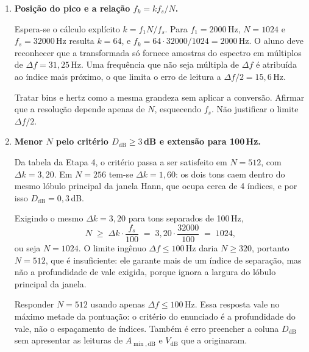 \documentclass[11pt,a4paper]{article}
\begin{document}
\begin{enumerate}[label=\textbf{Q\arabic*.}, leftmargin=*, itemsep=1em]

  \item \textbf{Posição do pico e a relação $f_k = k f_s/N$.}

    Espera-se o cálculo explícito $k = f_1 N / f_s$. Para $f_1 = 2000$\,Hz,
    $N = 1024$ e $f_s = 32000$\,Hz resulta $k = 64$, e
    $f_k = 64 \cdot 32000/1024 = 2000$\,Hz. O aluno deve reconhecer que a
    transformada só fornece amostras do espectro em múltiplos de
    $\Delta f = 31{,}25$\,Hz. Uma frequência que não seja múltipla de
    $\Delta f$ é atribuída ao índice mais próximo, o que limita o erro de
    leitura a $\Delta f/2 = 15{,}6$\,Hz.

    \begin{nota}
      Tratar bins e hertz como a mesma grandeza sem aplicar a conversão.
      Afirmar que a resolução depende apenas de $N$, esquecendo $f_s$. Não
      justificar o limite $\Delta f/2$.
    \end{nota}

  \item \textbf{Menor $N$ pelo critério $D_{\mathrm{dB}} \geq 3$\,dB e extensão
    para 100\,Hz.}

    Da tabela da Etapa 4, o critério passa a ser satisfeito em $N = 512$, com
    $\Delta k = 3{,}20$. Em $N = 256$ tem-se $\Delta k = 1{,}60$: os dois tons
    caem dentro do mesmo lóbulo principal da janela Hann, que ocupa cerca de 4
    índices, e por isso $D_{\mathrm{dB}} = 0{,}3$\,dB.

    Exigindo o mesmo $\Delta k = 3{,}20$ para tons separados de 100\,Hz,
    \[
      N \;\geq\; \Delta k \cdot \frac{f_s}{100}
        \;=\; 3{,}20 \cdot \frac{32000}{100} \;=\; 1024 ,
    \]
    ou seja $N = 1024$. O limite ingênuo $\Delta f \leq 100$\,Hz daria
    $N \geq 320$, portanto $N = 512$, que é insuficiente: ele garante mais de
    um índice de separação, mas não a profundidade de vale exigida, porque
    ignora a largura do lóbulo principal da janela.

    \begin{nota}
      Responder $N = 512$ usando apenas $\Delta f \leq 100$\,Hz. Essa resposta
      vale no máximo metade da pontuação: o critério do enunciado é a
      profundidade do vale, não o espaçamento de índices. Também é erro
      preencher a coluna $D_{\mathrm{dB}}$ sem apresentar as leituras de
      $A_{\min,\mathrm{dB}}$ e $V_{\mathrm{dB}}$ que a originaram.
    \end{nota}


\end{enumerate}
\end{document}
